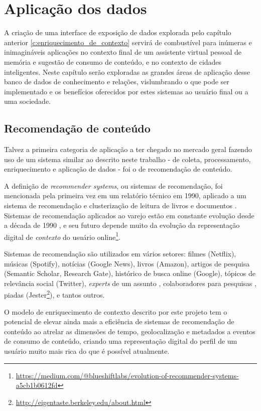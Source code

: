 \chapter{Aplicação dos dados} \label{c:aplicacao_dos_dados}

A criação de uma interface de exposição de dados explorada pelo capítulo anterior \ref{c:enriquecimento_de_contexto} servirá de combustível para inúmeras e inimagináveis aplicações no contexto final de um assistente virtual pessoal de memória e sugestão de consumo de conteúdo, e no contexto de cidades inteligentes. Neste capítulo serão exploradas as grandes áreas de aplicação desse banco de dados de conhecimento e relações, vislumbrando o que pode ser implementado e os benefícios oferecidos por estes sistemas ao usuário final ou a uma sociedade.

\section{Recomendação de conteúdo}

Talvez a primeira categoria de aplicação a ter chegado no mercado geral fazendo uso de um sistema similar ao descrito neste trabalho - de coleta, processamento, enriquecimento e aplicação de dados - foi o de recomendação de conteúdo.

A definição de \textit{recommender systems}, ou sistemas de recomendação, foi mencionada pela primeira vez em um relatório técnico em 1990, aplicado a um sistema de recomendação e clusterização de leitura de livros e documentos \cite{Karlgren931533}. Sistemas de recomendação aplicados ao varejo estão em constante evolução desde a década de 1990 \cite{twodecades:amazon}, e seu futuro depende muito da evolução da representação digital de \textit{contexto} do usuário online\footnote{\url{https://medium.com/@blueshiftlabs/evolution-of-recommender-systems-a5cb1b0612fd}}.

Sistemas de recomendação são utilizados em vários setores: filmes (Netflix), músicas (Spotify), notícias (Google News), livros (Amazon), artigos de pesquisa (Semantic Scholar, Research Gate), histórico de busca online (Google), tópicos de relevância social (Twitter), \textit{experts} de um assunto \cite{expertseer}, colaboradores para pesquisas \cite{collabseer}, piadas (Jester\footnote{\url{http://eigentaste.berkeley.edu/about.html}}), e tantos outros.

O modelo de enriquecimento de contexto descrito por este projeto tem o potencial de elevar ainda mais a eficiência de sistemas de recomendação de conteúdo ao atrelar as dimensões de tempo, geolocalização e metadados a eventos de consumo de conteúdo, criando uma representação digital do perfil de um usuário muito mais rica do que é possível atualmente.

